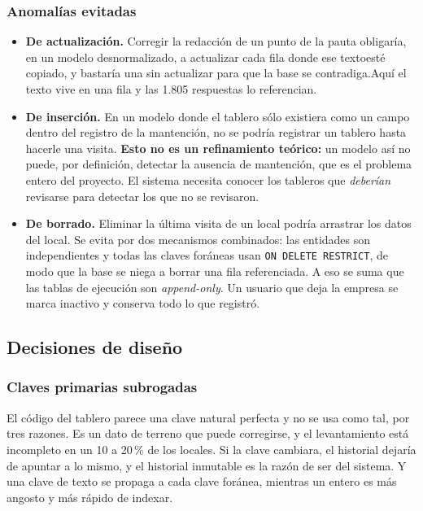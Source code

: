 \documentclass[10pt,letterpaper]{article}
\begin{document}
\subsubsection*{Anomalías evitadas}
\begin{itemize}
\item \textbf{De actualización.} Corregir la redacción de un punto de la pauta obligaría, en un modelo desnormalizado, a actualizar cada fila donde ese textoesté copiado, y bastaría una sin actualizar para que la base se contradiga.Aquí el texto vive en una fila y las 1.805 respuestas lo referencian.
\item \textbf{De inserción.} En un modelo donde el tablero sólo existiera como un campo dentro del registro de la mantención, no se podría registrar un tablero hasta hacerle una visita. \textbf{Esto no es un refinamiento teórico:} un modelo así no puede, por definición, detectar la ausencia de mantención, que es el problema entero del proyecto. El sistema necesita conocer los tableros que \emph{deberían} revisarse para detectar los que no se revisaron.
\item \textbf{De borrado.} Eliminar la última visita de un local podría arrastrar los datos del local. Se evita por dos mecanismos combinados: las entidades son independientes y todas las claves foráneas usan \texttt{ON DELETE RESTRICT}, de modo que la base se niega a borrar una fila referenciada. A eso se suma que las tablas de ejecución son \emph{append-only}. Un usuario que deja la empresa se marca inactivo y conserva todo lo que registró.
\end{itemize}

\newpage
\subsection{Decisiones de diseño}

\subsubsection*{Claves primarias subrogadas}

El código del tablero parece una clave natural perfecta y no se usa como tal,
por tres razones. Es un dato de terreno que puede corregirse, y el levantamiento
está incompleto en un 10 a 20\,\% de los locales. Si la clave cambiara, el
historial dejaría de apuntar a lo mismo, y el historial inmutable es la razón de
ser del sistema. Y una clave de texto se propaga a cada clave foránea, mientras
un entero es más angosto y más rápido de indexar.
\end{document}
